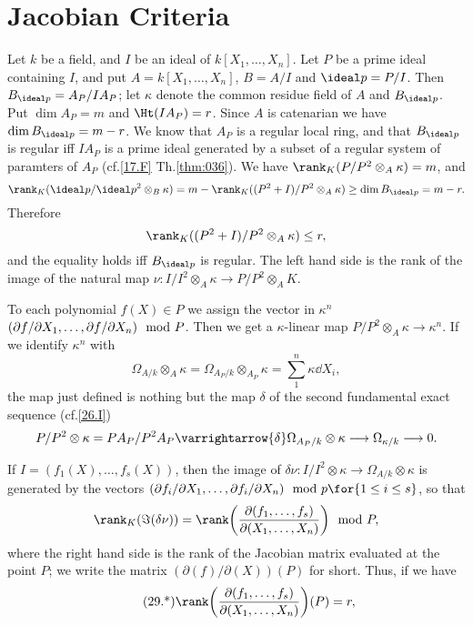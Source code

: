 \documentclass[../main]{subfiles}
\begin{document}
\section{Jacobian Criteria}\label{sec:29}
\newparagraph Let $k$ be a field, and $I$ be an ideal of $k[X_1, \ldots, X_n]$. Let $P$ be a prime ideal containing $I$, and put $A = k[X_1, \ldots, X_n]$, $B = A/I$ and $\ideal p = P/I$. Then $B_{\ideal p} = A_P/I A_P$; let $\kappa$ denote the common residue field of $A$ and $B_{\ideal p}$. Put $\dim A_P = m$ and $\Ht(I A_P) = r$. Since $A$ is catenarian we have $\dim B_{\ideal p} = m - r$. We know that $A_P$ is a regular local ring, and that $B_{\ideal p}$ is regular iff $IA_P$ is a prime ideal generated by a subset of a regular system of paramters of $A_P$ (cf.\ref{17.F} Th.\ref{thm:036}). We have $\rank_K(P/P^2 \otimes_A \kappa) = m$, and
\[
\rank_K(\ideal p/\ideal p^2 \otimes_B \kappa) = m - \rank_K ((P^2 + I)/P^2 \otimes_A \kappa) \ge \dim B_{\ideal p} = m - r.
\]
Therefore
\[
\rank_K ((P^2 + I)/P^2 \otimes_A \kappa) \le r,
\]
and the equality holds iff $B_{\ideal p}$ is regular. The left hand side is the rank of the image of the natural map $\nu : I/I^2 \otimes_A \kappa \longrightarrow P/P^2 \otimes_A K$. 

To each polynomial $f(X) \in P$ we assign the vector in $\kappa^n$ $(\partial f/\partial X_1, \ldots, \linebreak\partial f/\partial X_n) \mod P$. Then we get a $\kappa$-linear map $P/P^2 \otimes_A \kappa \longrightarrow \kappa^n$. If we identify $\kappa^n$ with \[\Omega_{A/k} \otimes_A \kappa = \Omega_{A_P/k} \otimes_{A_P} \kappa = \sum\limits_1^n \kappa \dd X_i,\] the map just defined is nothing but the map $\delta$ of the second fundamental exact sequence (cf.\ref{26.I})
\[
P/P^2 \otimes \kappa = P A_P/P^2 A_P \varrightarrow{\delta} \Omega_{A_P/k} \otimes \kappa \longrightarrow \Omega_{\kappa/k} \longrightarrow 0.
\]

If $I = (f_1(X), \ldots, f_s(X))$, then the image of $\delta \nu : I/I^2 \otimes \kappa \longrightarrow \Omega_{A/k} \otimes \kappa$ is generated by the vectors $(\partial f_i/\partial X_1, \ldots, \partial f_i/\partial X_n) \mod p\for{1 \le i \le s}$, so that \[\rank_K(\Im(\delta \nu)) = \rank\bigg(\dfrac{\partial(f_1, \ldots, f_s)}{\partial (X_1, \ldots, X_n)}\bigg) \mod P,\] where the right hand side is the rank of the Jacobian matrix evaluated at the point $P$; we write the matrix $(\partial(f)/\partial(X))(P)$ for short. Thus, if we have 
\begin{equation}
\label{eqn:s29}
\tag{29.*}
\rank\bigg(\dfrac{\partial(f_1, \ldots, f_s)}{\partial (X_1, \ldots, X_n)}\bigg)(P) = r,
\end{equation}
\end{document}
